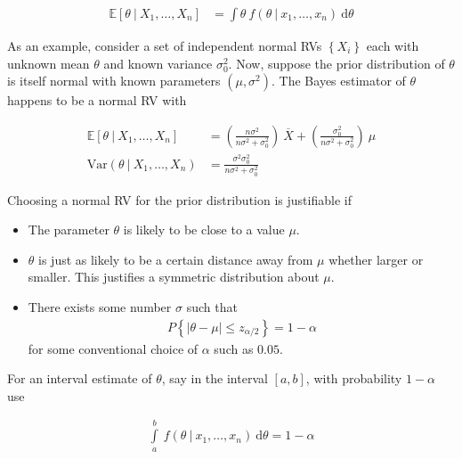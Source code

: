 \begin{align}
	\mathbb{E}[\theta\ |\ X_1, \dots, X_n] &= \int\limits \theta\ f(\theta\ |\ x_1, \dots, x_n)\ \mathrm{d}\theta
\end{align}

As an example, consider a set of independent normal RVs $ \left\{X_i\right\} $ each with unknown mean $ \theta $ and known variance $ \sigma_0^2 $. Now, suppose the prior distribution of $ \theta $ is itself normal with known parameters $ (\mu, \sigma^2) $. The Bayes estimator of $ \theta $ happens to be a normal RV with

\begin{align}
	\mathbb{E}[\theta\ |\ X_1, \dots, X_n] &= \left(\frac{n\sigma^2}{n\sigma^2 + \sigma_0^2}\right)\ \overline{X} + \left(\frac{\sigma_0^2}{n\sigma^2 + \sigma_0^2}\right)\ \mu \\
	\mathrm{Var}(\theta\ |\ X_1, \dots, X_n) &= \frac{\sigma^2 \sigma_0^2}{n\sigma^2 + \sigma_0^2}
\end{align}

Choosing a normal RV for the prior distribution is justifiable if


\begin{itemize}
	\item The parameter $ \theta $ is likely to be close to a value $ \mu $.
	
	\item $ \theta $ is just as likely to be a certain distance away from $ \mu $ whether larger or smaller. This justifies a symmetric distribution about $ \mu $.
	
	\item There exists some number $ \sigma $ such that \\
	\begin{align}
		P\left\{|\theta - \mu| \leq z_{\alpha/2}\right\} = 1- \alpha \nonumber
 	\end{align}
 	for some conventional choice of $ \alpha $ such as $ 0.05 $. 
\end{itemize}


For an interval estimate of $ \theta $, say in the interval $ [a,b] $, with probability $ 1-\alpha $ use

\begin{align}
	\int\limits_a^b \ f(\theta\ |\ x_1, \dots, x_n)\ \mathrm{d}\theta = 1 - \alpha
\end{align}








\newpage

